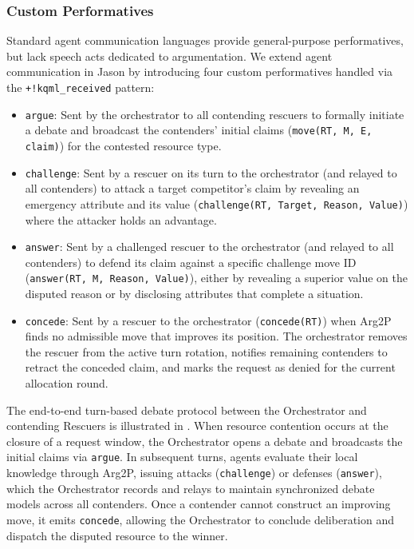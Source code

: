 \subsubsection{Custom Performatives}
Standard agent communication languages provide general-purpose performatives, but lack speech acts dedicated to argumentation. We extend agent communication in Jason by introducing four custom performatives handled via the \texttt{+!kqml\_received} pattern:

\begin{itemize}
    \item \texttt{argue}: Sent by the orchestrator to all contending rescuers to formally initiate a debate and broadcast the contenders' initial claims (\texttt{move(RT, M, E, claim)}) for the contested resource type.
    \item \texttt{challenge}: Sent by a rescuer on its turn to the orchestrator (and relayed to all contenders) to attack a target competitor's claim by revealing an emergency attribute and its value (\texttt{challenge(RT, Target, Reason, Value)}) where the attacker holds an advantage.
    \item \texttt{answer}: Sent by a challenged rescuer to the orchestrator (and relayed to all contenders) to defend its claim against a specific challenge move ID (\texttt{answer(RT, M, Reason, Value)}), either by revealing a superior value on the disputed reason or by disclosing attributes that complete a situation.
    \item \texttt{concede}: Sent by a rescuer to the orchestrator (\texttt{concede(RT)}) when Arg2P finds no admissible move that improves its position. The orchestrator removes the rescuer from the active turn rotation, notifies remaining contenders to retract the conceded claim, and marks the request as denied for the current allocation round.
\end{itemize}

The end-to-end turn-based debate protocol between the Orchestrator and contending Rescuers is illustrated in .
When resource contention occurs at the closure of a request window, the Orchestrator opens a debate and broadcasts the initial claims via \texttt{argue}. In subsequent turns, agents evaluate their local knowledge through Arg2P, issuing attacks (\texttt{challenge}) or defenses (\texttt{answer}), which the Orchestrator records and relays to maintain synchronized debate models across all contenders. Once a contender cannot construct an improving move, it emits \texttt{concede}, allowing the Orchestrator to conclude deliberation and dispatch the disputed resource to the winner.

